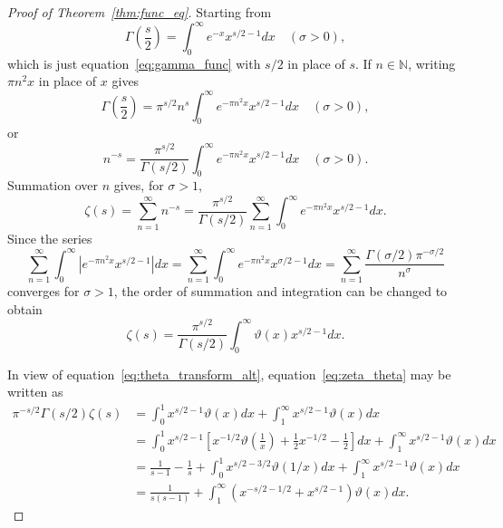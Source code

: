 \documentclass[11pt]{article}
\begin{document}
\begin{proof}[Proof of Theorem~\ref{thm:func_eq}]
Starting from
\begin{equation}\label{eq:gamma_integral}
\Gamma\left(\frac{s}{2}\right) = \int_0^{\infty} e^{-x} x^{s/2-1} dx \quad (\sigma > 0),
\end{equation}
which is just equation~\eqref{eq:gamma_func} with $s/2$ in place of $s$. If $n \in \mathbb{N}$, writing $\pi n^2 x$ in place of $x$ gives
\begin{equation}\label{eq:gamma_scaled}
\Gamma\left(\frac{s}{2}\right) = \pi^{s/2} n^s \int_0^{\infty} e^{-\pi n^2 x} x^{s/2-1} dx \quad (\sigma > 0),
\end{equation}
or
\begin{equation}\label{eq:zeta_integral_term}
n^{-s} = \frac{\pi^{s/2}}{\Gamma(s/2)} \int_0^{\infty} e^{-\pi n^2 x} x^{s/2-1} dx \quad (\sigma > 0).
\end{equation}
Summation over $n$ gives, for $\sigma > 1$,
\begin{equation}\label{eq:zeta_integral}
\zeta(s) = \sum_{n=1}^{\infty} n^{-s} = \frac{\pi^{s/2}}{\Gamma(s/2)} \sum_{n=1}^{\infty} \int_0^{\infty} e^{-\pi n^2 x} x^{s/2-1} dx.
\end{equation}
Since the series
\begin{equation}\label{eq:convergence}
\sum_{n=1}^{\infty} \int_0^{\infty} \left| e^{-\pi n^2 x} x^{s/2-1} \right| dx = \sum_{n=1}^{\infty} \int_0^{\infty} e^{-\pi n^2 x} x^{\sigma/2-1} dx = \sum_{n=1}^{\infty} \frac{\Gamma(\sigma/2) \pi^{-\sigma/2}}{n^{\sigma}}
\end{equation}
converges for $\sigma > 1$, the order of summation and integration can be changed to obtain
\begin{equation}\label{eq:zeta_theta}
\zeta(s) = \frac{\pi^{s/2}}{\Gamma(s/2)} \int_0^{\infty} \vartheta(x) x^{s/2-1} dx.
\end{equation}

In view of equation~\eqref{eq:theta_transform_alt}, equation~\eqref{eq:zeta_theta} may be written as
\begin{align}\label{eq:zeta_functional}
\pi^{-s/2} \Gamma(s/2) \zeta(s) &= \int_0^1 x^{s/2-1} \vartheta(x) dx + \int_1^{\infty} x^{s/2-1} \vartheta(x) dx \\
&= \int_0^1 x^{s/2-1} \left[ x^{-1/2} \vartheta\left(\frac{1}{x}\right) + \frac{1}{2} x^{-1/2} - \frac{1}{2} \right] dx + \int_1^{\infty} x^{s/2-1} \vartheta(x) dx \nonumber \\
&= \frac{1}{s-1} - \frac{1}{s} + \int_0^1 x^{s/2-3/2} \vartheta(1/x) dx + \int_1^{\infty} x^{s/2-1} \vartheta(x) dx \nonumber \\
&= \frac{1}{s(s-1)} + \int_1^{\infty} \left( x^{-s/2-1/2} + x^{s/2-1} \right) \vartheta(x) dx. \nonumber
\end{align}


\end{proof}
\end{document}
